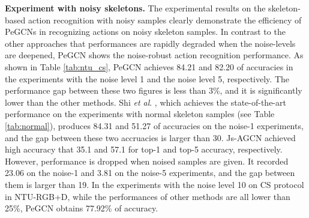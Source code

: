 \documentclass[runningheads]{llncs}
\newcommand{\etal}{\textit{et al}. }
\begin{document}
\textbf{Experiment with noisy skeletons.} The experimental results on the skeleton-based action recognition with noisy samples clearly demonstrate the efficiency of PeGCNs in recognizing actions on noisy skeleton samples. In contrast to the other approaches that performances are rapidly degraded when the noise-levels are deepened, PeGCN shows the noise-robust action recognition performance. As shown in Table \ref{tab:ntu_cs}, PeGCN achieves 84.21 and 82.20 of accuracies in the experiments with the noise level 1 and the noise level 5, respectively. The performance gap between these two figures is less than 3\%, and it is significantly lower than the other methods. Shi \etal \cite{shi2019two}, which achieves the state-of-the-art performance on the experiments with normal skeleton samples (see Table \ref{tab:normal}), produces 84.31 and 51.27 of accuracies on the noise-1 experiments, and the gap between these two accruacies is larger than 30. Js-AGCN \cite{shi2019two} achieved high accuracy that 35.1 and 57.1 for top-1 and top-5 accuracy, respectively. However, performance is dropped when noised samples are given. It recorded 23.06 on the noise-1 and 3.81 on the noise-5 experiments, and the gap between them is larger than 19. In the experiments with the noise level 10 on CS protocol in NTU-RGB+D, while the performances of other methods are all lower than 25\%, PeGCN obtains 77.92\% of accuracy.
\end{document}
